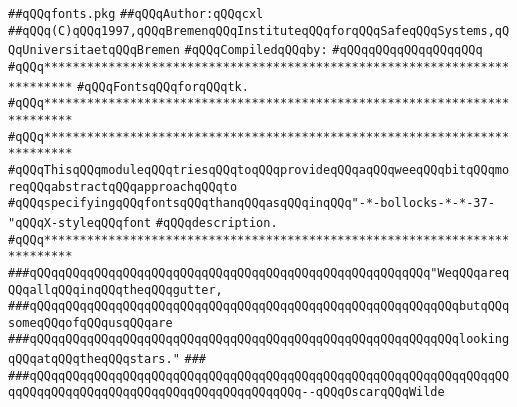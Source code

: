 \label{src/lib/tk/src/fonts.pkg}
\verb|##qQQqfonts.pkg|\newline
\verb|##qQQqAuthor:qQQqcxl|\newline
\verb|##qQQq(C)qQQq1997,qQQqBremenqQQqInstituteqQQqforqQQqSafeqQQqSystems,qQQqUniversitaetqQQqBremen|\newline
\newline
\verb|#qQQqCompiledqQQqby:|\newline
\verb|#qQQqqQQqqQQqqQQqqQQq|\newline
\newline
\newline
\verb|#qQQq**************************************************************************|\newline
\verb|#qQQqFontsqQQqforqQQqtk.|\newline
\verb|#qQQq**************************************************************************|\newline
\newline
\verb|#qQQq**************************************************************************|\newline
\verb|#qQQqThisqQQqmoduleqQQqtriesqQQqtoqQQqprovideqQQqaqQQqweeqQQqbitqQQqmoreqQQqabstractqQQqapproachqQQqto|\newline
\verb|#qQQqspecifyingqQQqfontsqQQqthanqQQqasqQQqinqQQq"-*-bollocks-*-*-37-"qQQqX-styleqQQqfont|\newline
\verb|#qQQqdescription.|\newline
\verb|#qQQq**************************************************************************|\newline
\newline
\newline
\newline
\verb|###qQQqqQQqqQQqqQQqqQQqqQQqqQQqqQQqqQQqqQQqqQQqqQQqqQQqqQQq"WeqQQqareqQQqallqQQqinqQQqtheqQQqgutter,|\newline
\verb|###qQQqqQQqqQQqqQQqqQQqqQQqqQQqqQQqqQQqqQQqqQQqqQQqqQQqqQQqqQQqbutqQQqsomeqQQqofqQQqusqQQqare|\newline
\verb|###qQQqqQQqqQQqqQQqqQQqqQQqqQQqqQQqqQQqqQQqqQQqqQQqqQQqqQQqqQQqlookingqQQqatqQQqtheqQQqstars."|\newline
\verb|###|\newline
\verb|###qQQqqQQqqQQqqQQqqQQqqQQqqQQqqQQqqQQqqQQqqQQqqQQqqQQqqQQqqQQqqQQqqQQqqQQqqQQqqQQqqQQqqQQqqQQqqQQqqQQqqQQqqQQq--qQQqOscarqQQqWilde|\newline
\newline

